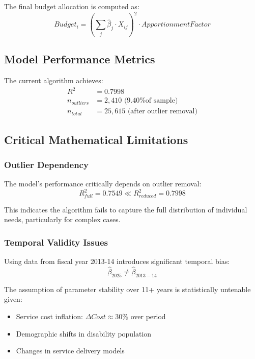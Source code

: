 The final budget allocation is computed as:
\begin{equation}
Budget_i = \left(\sum_{j} \hat{\beta}_j \cdot X_{ij}\right)^2 \cdot ApportionmentFactor
\end{equation}

\subsection{Model Performance Metrics}

The current algorithm achieves:
\begin{align}
R^2 &= 0.7998 \\
n_{outliers} &= 2,410 \text{ (9.40\% of sample)} \\
n_{total} &= 25,615 \text{ (after outlier removal)}
\end{align}

\subsection{Critical Mathematical Limitations}

\subsubsection{Outlier Dependency}
The model's performance critically depends on outlier removal:
\begin{equation}
R^2_{full} = 0.7549 \ll R^2_{reduced} = 0.7998
\end{equation}

This indicates the algorithm fails to capture the full distribution of individual needs, particularly for complex cases.

\subsubsection{Temporal Validity Issues}
Using data from fiscal year 2013-14 introduces significant temporal bias:
\begin{equation}
\hat{\beta}_{2025} \neq \hat{\beta}_{2013-14}
\end{equation}

The assumption of parameter stability over 11+ years is statistically untenable given:
\begin{itemize}
    \item Service cost inflation: $\Delta Cost \approx 30\%$ over period
    \item Demographic shifts in disability population
    \item Changes in service delivery models
\end{itemize}

